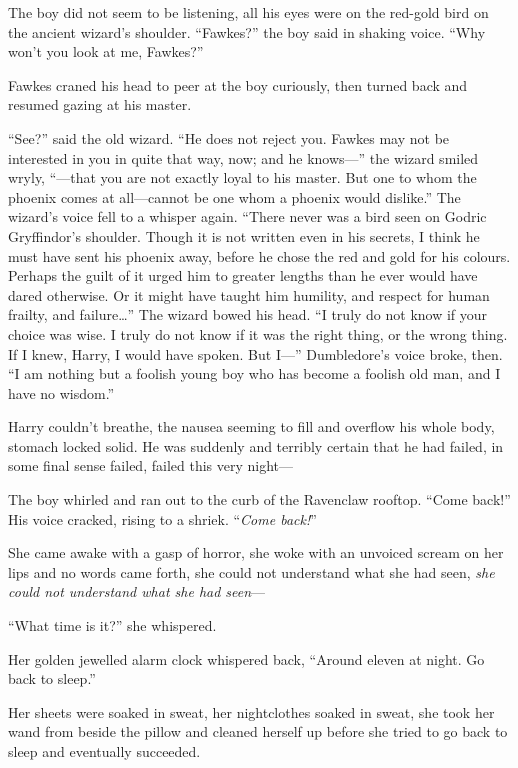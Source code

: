 The boy did not seem to be listening, all his eyes were on the red-gold bird on the ancient wizard’s shoulder. “Fawkes?” the boy said in shaking voice. “Why won’t you look at me, Fawkes?”

Fawkes craned his head to peer at the boy curiously, then turned back and resumed gazing at his master.

“See?” said the old wizard. “He does not reject you. Fawkes may not be interested in you in quite that way, now; and he knows—” the wizard smiled wryly, “—that you are not exactly loyal to his master. But one to whom the phoenix comes at all—cannot be one whom a phoenix would dislike.” The wizard’s voice fell to a whisper again. “There never was a bird seen on Godric Gryffindor’s shoulder. Though it is not written even in his secrets, I think he must have sent his phoenix away, before he chose the red and gold for his colours. Perhaps the guilt of it urged him to greater lengths than he ever would have dared otherwise. Or it might have taught him humility, and respect for human frailty, and failure…” The wizard bowed his head. “I truly do not know if your choice was wise. I truly do not know if it was the right thing, or the wrong thing. If I knew, Harry, I would have spoken. But I—” Dumbledore’s voice broke, then. “I am nothing but a foolish young boy who has become a foolish old man, and I have no wisdom.”

Harry couldn’t breathe, the nausea seeming to fill and overflow his whole body, stomach locked solid. He was suddenly and terribly certain that he had failed, in some final sense failed, failed this very night—

The boy whirled and ran out to the curb of the Ravenclaw rooftop. “Come back!” His voice cracked, rising to a shriek. “\emph{Come back!}”


She came awake with a gasp of horror, she woke with an unvoiced scream on her lips and no words came forth, she could not understand what she had seen, \emph{she could not understand what she had seen}—

“What time is it?” she whispered.

Her golden jewelled alarm clock whispered back, “Around eleven at night. Go back to sleep.”

Her sheets were soaked in sweat, her nightclothes soaked in sweat, she took her wand from beside the pillow and cleaned herself up before she tried to go back to sleep and eventually succeeded.

